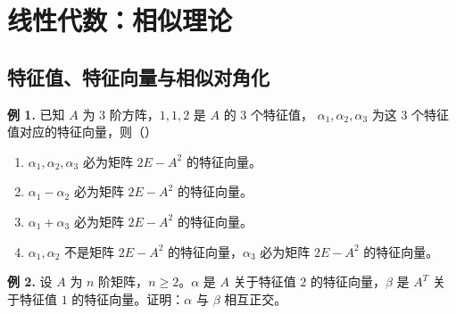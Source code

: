 \chapter{线性代数：相似理论}

\section{特征值、特征向量与相似对角化}

\begin{problemblock}
\textbf{例 1.} 已知 \(A\) 为 \(3\) 阶方阵，\(1,1,2\) 是 \(A\) 的 \(3\) 个特征值，
\(\alpha_1,\alpha_2,\alpha_3\) 为这 \(3\) 个特征值对应的特征向量，则（\quad）

\begin{enumerate}[label=\Alph*.]
\item \(\alpha_1,\alpha_2,\alpha_3\) 必为矩阵 \(2E-A^2\) 的特征向量。
\item \(\alpha_1-\alpha_2\) 必为矩阵 \(2E-A^2\) 的特征向量。
\item \(\alpha_1+\alpha_3\) 必为矩阵 \(2E-A^2\) 的特征向量。
\item \(\alpha_1,\alpha_2\) 不是矩阵 \(2E-A^2\) 的特征向量，\(\alpha_3\) 必为矩阵 \(2E-A^2\) 的特征向量。
\end{enumerate}
\end{problemblock}
\begin{solutionblock}
\end{solutionblock}

\begin{problemblock}
\textbf{例 2.} 设 \(A\) 为 \(n\) 阶矩阵，\(n\ge2\)。\(\alpha\) 是 \(A\) 关于特征值 \(2\) 的特征向量，\(\beta\) 是 \(A^T\) 关于特征值 \(1\) 的特征向量。证明：\(\alpha\) 与 \(\beta\) 相互正交。
\end{problemblock}
\begin{solutionblock}
\end{solutionblock}

